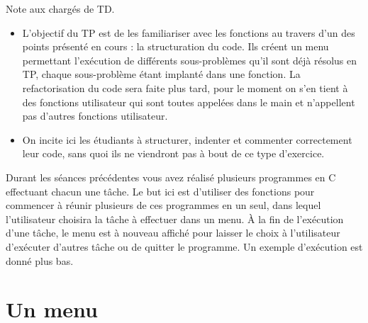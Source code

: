 



\begin{correction}
  Note aux chargés de TD.
  \begin{itemize}
  \item L'objectif du TP est de les familiariser avec les fonctions au
    travers d'un des points présenté en cours : la structuration du
    code. Ils créent un menu permettant l'exécution de différents
    sous-problèmes qu'il sont déjà résolus en TP, chaque sous-problème
    étant implanté dans une fonction. La refactorisation du code sera
    faite plus tard, pour le moment on s'en tient à des fonctions
    utilisateur qui
    sont toutes appelées dans le main et n'appellent pas d'autres
    fonctions utilisateur.
  \item On incite ici les étudiants à structurer, indenter et
    commenter correctement leur code, sans quoi ils ne viendront pas à
    bout de ce type d'exercice.
  \end{itemize}
\end{correction}

Durant les séances précédentes vous avez réalisé plusieurs programmes en C
effectuant chacun une tâche. Le but ici est d'utiliser des
fonctions pour commencer à réunir plusieurs de ces programmes en un
seul, dans lequel l'utilisateur choisira la tâche à effectuer dans un
menu. À la fin de l'exécution d'une tâche, le menu est à nouveau
affiché pour laisser le choix à l'utilisateur d'exécuter d'autres
tâche ou de quitter le programme. Un exemple d'exécution est donné
plus bas.

\section{Un menu}


